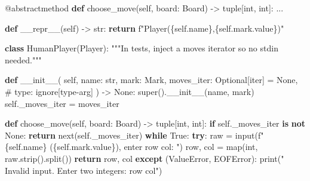 \documentclass[11pt]{article}
\newenvironment{Shaded}{\begin{snugshade}}{\end{snugshade}}
\newcommand{\AttributeTok}[1]{\textcolor[rgb]{0.16,0.50,0.73}{#1}}
\newcommand{\BuiltInTok}[1]{\textcolor[rgb]{0.50,0.55,0.55}{#1}}
\newcommand{\CommentTok}[1]{\textcolor[rgb]{0.48,0.49,0.49}{#1}}
\newcommand{\ControlFlowTok}[1]{\textcolor[rgb]{0.99,0.74,0.29}{\textbf{#1}}}
\newcommand{\FunctionTok}[1]{\textcolor[rgb]{0.56,0.27,0.68}{#1}}
\newcommand{\KeywordTok}[1]{\textcolor[rgb]{0.81,0.81,0.76}{\textbf{#1}}}
\newcommand{\NormalTok}[1]{\textcolor[rgb]{0.81,0.81,0.76}{#1}}
\newcommand{\OperatorTok}[1]{\textcolor[rgb]{0.81,0.81,0.76}{#1}}
\newcommand{\PreprocessorTok}[1]{\textcolor[rgb]{0.15,0.68,0.38}{#1}}
\newcommand{\SpecialCharTok}[1]{\textcolor[rgb]{0.24,0.68,0.91}{#1}}
\newcommand{\SpecialStringTok}[1]{\textcolor[rgb]{0.85,0.27,0.33}{#1}}
\newcommand{\StringTok}[1]{\textcolor[rgb]{0.96,0.31,0.31}{#1}}
\newcommand{\VariableTok}[1]{\textcolor[rgb]{0.15,0.68,0.68}{#1}}
\begin{document}
\begin{Shaded}
\begin{Highlighting}[]
    \AttributeTok{@abstractmethod}
    \KeywordTok{def}\NormalTok{ choose\_move(}\VariableTok{self}\NormalTok{, board: Board) }\OperatorTok{{-}\textgreater{}} \BuiltInTok{tuple}\NormalTok{[}\BuiltInTok{int}\NormalTok{, }\BuiltInTok{int}\NormalTok{]:}
\NormalTok{        ...}

    \KeywordTok{def} \FunctionTok{\_\_repr\_\_}\NormalTok{(}\VariableTok{self}\NormalTok{) }\OperatorTok{{-}\textgreater{}} \BuiltInTok{str}\NormalTok{:}
        \ControlFlowTok{return} \SpecialStringTok{f"Player(}\SpecialCharTok{\{}\VariableTok{self}\SpecialCharTok{.}\NormalTok{name}\SpecialCharTok{\}}\SpecialStringTok{,}\SpecialCharTok{\{}\VariableTok{self}\SpecialCharTok{.}\NormalTok{mark}\SpecialCharTok{.}\NormalTok{value}\SpecialCharTok{\}}\SpecialStringTok{)"}


\KeywordTok{class}\NormalTok{ HumanPlayer(Player):}
    \CommentTok{"""In tests, inject a moves iterator so no stdin needed."""}

    \KeywordTok{def} \FunctionTok{\_\_init\_\_}\NormalTok{(}
        \VariableTok{self}\NormalTok{,}
\NormalTok{        name: }\BuiltInTok{str}\NormalTok{,}
\NormalTok{        mark: Mark,}
\NormalTok{        moves\_iter: Optional[}\BuiltInTok{iter}\NormalTok{] }\OperatorTok{=} \VariableTok{None}\NormalTok{,  }\CommentTok{\# type: ignore[type{-}arg]}
\NormalTok{    ) }\OperatorTok{{-}\textgreater{}} \VariableTok{None}\NormalTok{:}
        \BuiltInTok{super}\NormalTok{().}\FunctionTok{\_\_init\_\_}\NormalTok{(name, mark)}
        \VariableTok{self}\NormalTok{.\_moves\_iter }\OperatorTok{=}\NormalTok{ moves\_iter}

    \KeywordTok{def}\NormalTok{ choose\_move(}\VariableTok{self}\NormalTok{, board: Board) }\OperatorTok{{-}\textgreater{}} \BuiltInTok{tuple}\NormalTok{[}\BuiltInTok{int}\NormalTok{, }\BuiltInTok{int}\NormalTok{]:}
        \ControlFlowTok{if} \VariableTok{self}\NormalTok{.\_moves\_iter }\KeywordTok{is} \KeywordTok{not} \VariableTok{None}\NormalTok{:}
            \ControlFlowTok{return} \BuiltInTok{next}\NormalTok{(}\VariableTok{self}\NormalTok{.\_moves\_iter)}
        \ControlFlowTok{while} \VariableTok{True}\NormalTok{:}
            \ControlFlowTok{try}\NormalTok{:}
\NormalTok{                raw }\OperatorTok{=} \BuiltInTok{input}\NormalTok{(}\SpecialStringTok{f"}\SpecialCharTok{\{}\VariableTok{self}\SpecialCharTok{.}\NormalTok{name}\SpecialCharTok{\}}\SpecialStringTok{ (}\SpecialCharTok{\{}\VariableTok{self}\SpecialCharTok{.}\NormalTok{mark}\SpecialCharTok{.}\NormalTok{value}\SpecialCharTok{\}}\SpecialStringTok{), enter row col: "}\NormalTok{)}
\NormalTok{                row, col }\OperatorTok{=} \BuiltInTok{map}\NormalTok{(}\BuiltInTok{int}\NormalTok{, raw.strip().split())}
                \ControlFlowTok{return}\NormalTok{ row, col}
            \ControlFlowTok{except}\NormalTok{ (}\PreprocessorTok{ValueError}\NormalTok{, }\PreprocessorTok{EOFError}\NormalTok{):}
                \BuiltInTok{print}\NormalTok{(}\StringTok{"  Invalid input. Enter two integers: row col"}\NormalTok{)}



\end{Highlighting}
\end{Shaded}
\end{document}
